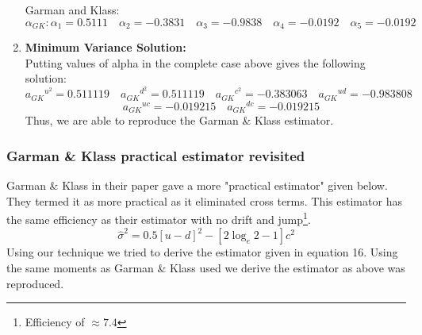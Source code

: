 \documentclass[12pt]{article}   	%
\begin{document}
\begin{enumerate}
Garman and Klass:\quad $\alpha_{GK}: \alpha_1=0.5111\quad \alpha_2=-0.3831\quad \alpha_3=-0.9838 \quad \alpha_4=-0.0192\quad \alpha_5=-0.0192$ 

\item \textbf{Minimum Variance Solution:}\\
Putting values of alpha in the complete case above gives the following solution:\\
$${a_{GK}}^{u^2}=0.511119\quad{a_{GK}}^{d^2}=0.511119\quad{a_{GK}}^{c^2}=-0.383063\quad{a_{GK}}^{ud}=-0.983808$$
$$\quad{a_{GK}}^{uc}=-0.019215\quad{a_{GK}}^{dc}=-0.019215$$
Thus, we are able to reproduce the Garman \& Klass estimator.
\end{enumerate}

\subsubsection{Garman \& Klass practical estimator revisited}
Garman \& Klass in their paper gave a more "practical estimator" given below. They termed it as more practical as it eliminated cross terms. This estimator has the same efficiency as their estimator with no drift and jump\footnote{Efficiency of $\approx 7.4$}.
\begin{equation}
\hat{\sigma}^2=0.5[u-d]^2-[2\log_e2-1]c^2
\end{equation}
Using our technique we tried to derive the estimator given in equation 16. Using the same moments as Garman \& Klass used we derive the estimator as above was reproduced.

\end{document}
